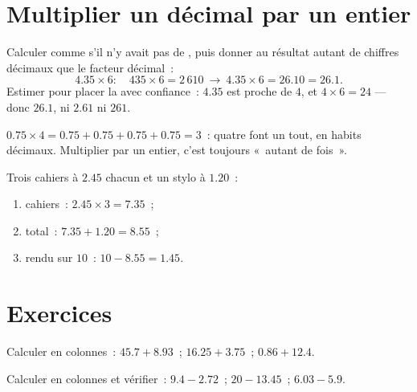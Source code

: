 \section{Multiplier un décimal par un entier}

\begin{method}\label{met:g5:decimalops:mult}
Calculer comme s'il n'y avait pas de , puis donner au
résultat autant de chiffres décimaux que le facteur décimal~:
\[
4.35 \times 6: \quad 435 \times 6 = 2\,610
\ \to\ 4.35 \times 6 = 26.10 = 26.1 .
\]
Estimer pour placer la  avec confiance~: $4.35$ est proche
de $4$, et $4 \times 6 = 24$ --- donc $26.1$, ni $2.61$ ni $261$.
\end{method}

\begin{example}\label{ex:g5:decimalops:mult}
$0.75 \times 4 = 0.75 + 0.75 + 0.75 + 0.75 = 3$~: quatre 
font un tout, en habits décimaux. Multiplier par un entier, c'est
toujours «~autant de fois~».
\end{example}

\begin{example}[Courses]\label{ex:g5:decimalops:shopping}
Trois cahiers à $2.45$ chacun et un stylo à $1.20$~:
\begin{enumerate}
  \item cahiers~: $2.45 \times 3 = 7.35$~;
  \item total~: $7.35 + 1.20 = 8.55$~;
  \item rendu sur $10$~: $10 - 8.55 = 1.45$.
\end{enumerate}
\end{example}

\section{Exercices}

\begin{exercise}[$\star$]\label{exo:g5:decimalops:1}
Calculer en colonnes~: $45.7 + 8.93$~; \quad $16.25 + 3.75$~; \quad
$0.86 + 12.4$.
\end{exercise}

\begin{exercise}[$\star$]\label{exo:g5:decimalops:2}
Calculer en colonnes et vérifier~: $9.4 - 2.72$~; \quad
$20 - 13.45$~; \quad $6.03 - 5.9$.
\end{exercise}

